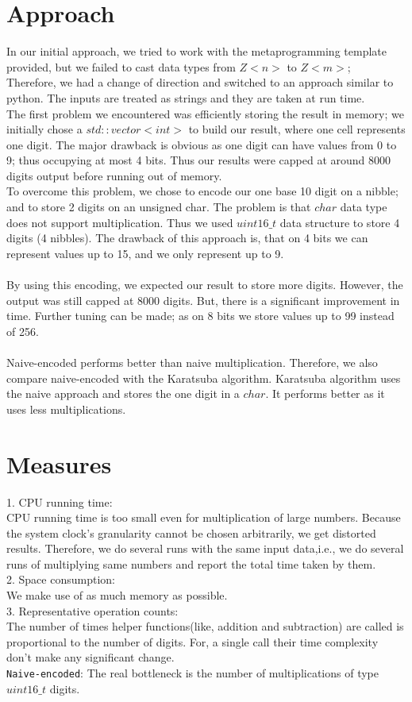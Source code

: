 \documentclass{DIKU-report}
\begin{document}
\section{Approach}
In our initial approach, we tried to work with the metaprogramming template provided, but we failed to cast data types from $Z<n>$ to $Z<m>$;\\
Therefore, we had a change of direction and switched to an approach similar to python. The inputs are treated as strings and they are taken at run time.\\
The first problem we encountered was efficiently storing the result in memory; we initially chose a $std::vector<int>$ to build our result, where one cell represents one digit. The major drawback is obvious as one digit can have values from 0 to 9; thus occupying at most 4 bits. Thus our results were capped at around 8000 digits output before running out of memory.\\
To overcome this problem, we chose to encode our one base 10 digit on a nibble; and to store 2 digits on an unsigned char. The problem is that $char$ data type does not support multiplication. Thus we used $uint16\_t$ data structure to store 4 digits (4 nibbles). The drawback of this approach is, that on 4 bits we can represent values up to 15, and we only represent up to 9.\\
\\
By using this encoding, we expected our result to store more digits. However, the output was still capped at 8000 digits. But, there is a significant improvement in time. Further tuning can be made; as on 8 bits we store values up to 99 instead of 256.\\
\\Naive-encoded performs better than naive multiplication. Therefore, we also compare naive-encoded with the Karatsuba algorithm. Karatsuba algorithm uses the naive approach and stores the one digit in a $char$. It performs better as it uses less multiplications. 

\section{Measures}
1. CPU running time:
\\CPU running time is too small even for multiplication of large numbers. Because the system clock’s granularity cannot be chosen arbitrarily, we get distorted results. Therefore, we do several runs with the same input data,i.e., we do several runs of multiplying same numbers and report the total time taken by them.
\\2. Space consumption: 
\\We make use of as much memory as possible.
\\3. Representative operation counts:
\\The number of times helper functions(like, addition and subtraction) are called is proportional to the number of digits. For, a single call their time complexity don't make any significant change. 
\\\texttt{Naive-encoded}: The real bottleneck is the number of multiplications of type $uint16\_t$ digits.
\end{document}
